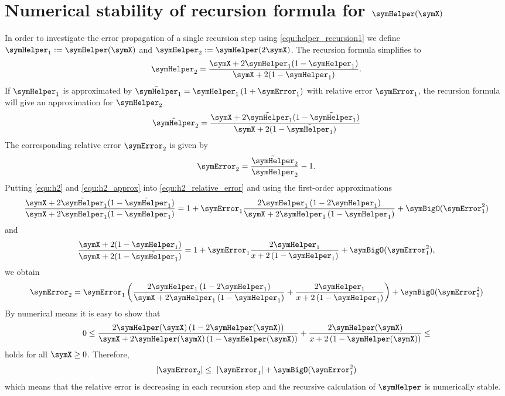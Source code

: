 \documentclass[11pt]{article} %
\begin{document}
\section{Numerical stability of recursion formula for $\symHelper(\symX)$}
\label{app:helper_stable}
In order to investigate the error propagation of a single recursion step using \eqref{equ:helper_recursion1} we define $\symHelper_1 := \symHelper(\symX)$ and $\symHelper_2 := \symHelper(2\symX)$. The recursion formula simplifies to
\begin{equation}
\label{equ:h2}
\symHelper_2 = \frac{\symX+2\symHelper_1(1-\symHelper_1)}{\symX+2(1-\symHelper_1)}.
\end{equation}
If $\symHelper_1$ is approximated by $\tilde{\symHelper}_1 = \symHelper_1\left(1+\symError_1\right)$ with relative error $\symError_1$, the recursion formula will give an approximation for $\symHelper_2$
\begin{equation}
\label{equ:h2_approx}
\tilde{\symHelper}_2 = 
\frac{\symX+2\tilde{\symHelper}_1(1-\tilde{\symHelper}_1)}{\symX+2(1-\tilde{\symHelper_1})}
\end{equation}
The corresponding relative error $\symError_2$ is given by
\begin{equation}
\label{equ:h2_relative_error}
\symError_2 = \frac{\tilde{\symHelper}_2}{\symHelper_2}-1.
\end{equation}
Putting \eqref{equ:h2} and \eqref{equ:h2_approx} into \eqref{equ:h2_relative_error} and using the first-order approximations 
\begin{equation}
\frac{\symX+2\tilde{\symHelper}_1(1-\tilde{\symHelper}_1)}
{\symX+2\symHelper_1(1-\symHelper_1)}
=
1
+
\symError_1
\frac{2\symHelper_1\left(1-2\symHelper_1\right)}
{\symX + 2\symHelper_1\left(1-\symHelper_1\right)}
+\symBigO(\symError_1^2)
\end{equation}
and
\begin{equation}
\frac{\symX+2(1-\symHelper_1)}
{\symX+2(1-\tilde{\symHelper}_1)}
=
1
+
\symError_1
\frac{2\symHelper_1}{x+2\left(1-\symHelper_1\right)}
+\symBigO(\symError_1^2),
\end{equation}
we obtain
\begin{equation}
\symError_2
=
\symError_1
\left(
\frac{2\symHelper_1\left(1-2\symHelper_1\right)}
{\symX + 2\symHelper_1\left(1-\symHelper_1\right)}
+
\frac{2\symHelper_1}{x+2\left(1-\symHelper_1\right)}
\right)
+\symBigO(\symError_1^2)
\end{equation}
By numerical means it is easy to show that
\begin{equation}
0\leq\frac{2\symHelper(\symX)\left(1-2\symHelper(\symX)\right)}
{\symX + 2\symHelper(\symX)\left(1-\symHelper(\symX)\right)}
+
\frac{2\symHelper(\symX)}{x+2\left(1-\symHelper(\symX)\right)} \leq 
\end{equation}
holds for all $\symX \geq 0$. Therefore,
\begin{equation}
|\symError_2|\leq \  |\symError_1| + \symBigO(\symError_1^2)
\end{equation}
which means that the relative error is decreasing in each recursion step and the recursive calculation of $\symHelper$ is numerically stable.
\end{document}
